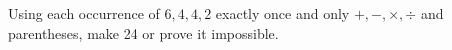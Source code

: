 Using each occurrence of $6,4,4,2$ exactly once and only $+,-,\times,\div$ and parentheses, make 24 or prove it impossible.
